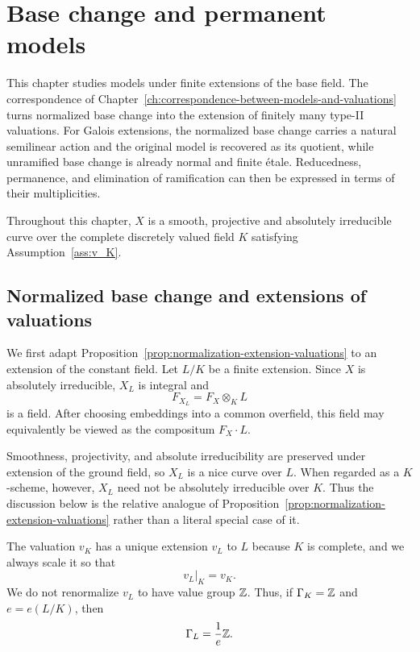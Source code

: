 \chapter{Base change and permanent models}\label{ch:base-change-and-permanent-models}

This chapter studies models under finite extensions of the base field.
The correspondence of Chapter~\ref{ch:correspondence-between-models-and-valuations} turns normalized base change into the extension of finitely many type-II valuations.
For Galois extensions, the normalized base change carries a natural semilinear action and the original model is recovered as its quotient, while unramified base change is already normal and finite étale.
Reducedness, permanence, and elimination of ramification can then be expressed in terms of their multiplicities.

Throughout this chapter, $X$ is a smooth, projective and absolutely irreducible curve over the complete discretely valued field $K$ satisfying Assumption~\ref{ass:v_K}.

\section{Normalized base change and extensions of valuations}\label{sec:normalized-base-change}

We first adapt Proposition~\ref{prop:normalization-extension-valuations} to an extension of the constant field.
Let $L/K$ be a finite extension.
Since $X$ is absolutely irreducible, $X_L$ is integral and
\[
    F_{X_L}=F_X\otimes_K L %
\]
is a field.
After choosing embeddings into a common overfield, this field may equivalently be viewed as the compositum $F_X\mathbin{\cdot}L$.

\begin{remark}\label{rem:nice-curve-after-base-change}
    Smoothness, projectivity, and absolute irreducibility are preserved under extension of the ground field, so $X_L$ is a nice curve over $L$.
    When regarded as a $K$-scheme, however, $X_L$ need not be absolutely irreducible over $K$.
    Thus the discussion below is the relative analogue of Proposition~\ref{prop:normalization-extension-valuations} rather than a literal special case of it.
\end{remark}

The valuation $v_K$ has a unique extension $v_L$ to $L$ because $K$ is complete, and we always scale it so that
\[
    v_L|_K=v_K.
\]
We do not renormalize $v_L$ to have value group $\mathbb Z$.
Thus, if $\Gamma_K=\mathbb Z$ and $e=e(L/K)$, then
\[
    \Gamma_L=\frac1e\mathbb Z.
\]

